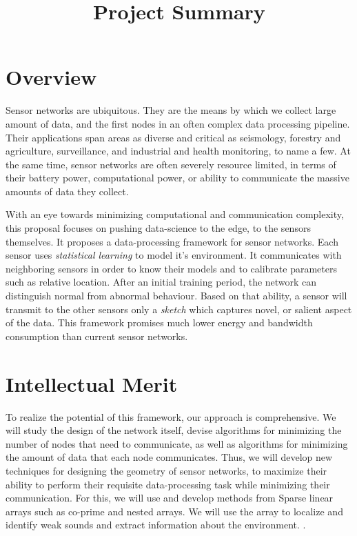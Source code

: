 \documentclass{article}
\title{Project Summary}
\begin{document}
\section{Overview}
Sensor networks are ubiquitous. They are the means by which we collect large amount of data, and the first nodes in an often complex data processing pipeline. Their applications span areas as diverse and critical as seismology, forestry and agriculture, surveillance, and industrial and health monitoring, to name a few. At the same time, sensor networks are often severely resource limited, in terms of their battery power, computational power, or ability to communicate the massive amounts of data they collect.

With an eye towards minimizing computational and communication complexity, this proposal focuses on pushing data-science to the edge, to the sensors themselves.  It proposes a data-processing framework for sensor networks. Each sensor uses {\em
  statistical learning} to model it's environment. It communicates
with neighboring sensors in order to know their models and to
calibrate parameters such as relative location. After an initial
training period, the network can distinguish normal from abnormal
behaviour. Based on that ability, a sensor will transmit to the other
sensors only a {\em sketch} which captures  novel, or
salient aspect of the data. This framework promises much lower energy and bandwidth
consumption than current sensor networks. 

\section{Intellectual Merit}
 To realize the potential of this framework, 
 our approach is comprehensive. We will study the design of the network itself, devise algorithms for minimizing the number of nodes that need to communicate, as well as algorithms for minimizing the amount of data that each node communicates. 
Thus, we will develop new techniques for designing the geometry of sensor networks, to maximize their ability to perform their requisite data-processing task while minimizing their communication. For this, we will use and develop methods from Sparse linear arrays such as co-prime and nested arrays.
We will use the array to localize and identify weak sounds and extract information about the environment. 
. 
\end{document}

